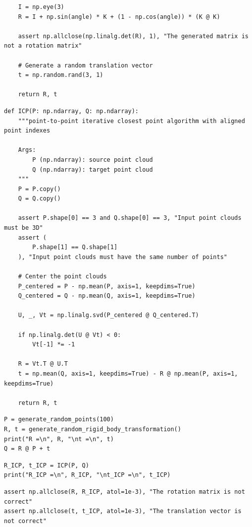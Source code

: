 \documentclass[conference,onecolumn]{IEEEtran}
\begin{document}
\begin{enumerate}[label=\arabic{enumi}.]
\begin{lstlisting}
    I = np.eye(3)
    R = I + np.sin(angle) * K + (1 - np.cos(angle)) * (K @ K)

    assert np.allclose(np.linalg.det(R), 1), "The generated matrix is not a rotation matrix"

    # Generate a random translation vector
    t = np.random.rand(3, 1)

    return R, t
          \end{lstlisting}
          \begin{lstlisting}
def ICP(P: np.ndarray, Q: np.ndarray):
    """point-to-point iterative closest point algorithm with aligned point indexes

    Args:
        P (np.ndarray): source point cloud
        Q (np.ndarray): target point cloud
    """
    P = P.copy()
    Q = Q.copy()

    assert P.shape[0] == 3 and Q.shape[0] == 3, "Input point clouds must be 3D"
    assert (
        P.shape[1] == Q.shape[1]
    ), "Input point clouds must have the same number of points"

    # Center the point clouds
    P_centered = P - np.mean(P, axis=1, keepdims=True)
    Q_centered = Q - np.mean(Q, axis=1, keepdims=True)

    U, _, Vt = np.linalg.svd(P_centered @ Q_centered.T)

    if np.linalg.det(U @ Vt) < 0:
        Vt[-1] *= -1

    R = Vt.T @ U.T
    t = np.mean(Q, axis=1, keepdims=True) - R @ np.mean(P, axis=1, keepdims=True)

    return R, t
          \end{lstlisting}
          \begin{lstlisting}
P = generate_random_points(100)
R, t = generate_random_rigid_body_transformation()
print("R =\n", R, "\nt =\n", t)
Q = R @ P + t
          \end{lstlisting}
          \begin{lstlisting}
R_ICP, t_ICP = ICP(P, Q)
print("R_ICP =\n", R_ICP, "\nt_ICP =\n", t_ICP)
          \end{lstlisting}
          \begin{lstlisting}
assert np.allclose(R, R_ICP, atol=1e-3), "The rotation matrix is not correct"
assert np.allclose(t, t_ICP, atol=1e-3), "The translation vector is not correct"
          \end{lstlisting}


\end{enumerate}
\end{document}
